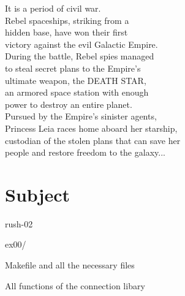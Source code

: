 \documentclass[12pt]{article}
\begin{document}
\begin{flushleft}
    It is a period of civil war.\\
    Rebel spaceships, striking from a\\
    hidden base, have won their first\\
    victory against the evil Galactic Empire.\\[1em]

    During the battle, Rebel spies managed\\
    to steal secret plans to the Empire's\\
    ultimate weapon, the DEATH STAR,\\
    an armored space station with enough\\
    power to destroy an entire planet.\\[1em]

    Pursued by the Empire's sinister agents,\\
    Princess Leia races home aboard her starship,\\
    custodian of the stolen plans that can save her\\
    people and restore freedom to the galaxy...
    \end{flushleft}

\newpage

\section{Subject}

\begin{description}[labelwidth=3cm, leftmargin=!]
  \item[Exercise 00] rush-02
  \item[Turn-in directory:] ex00/
  \item[Files to turn in:] Makefile and all the necessary files
  \item[Allowed functions:] All functions of the connection libary
\end{description}
\end{document}
